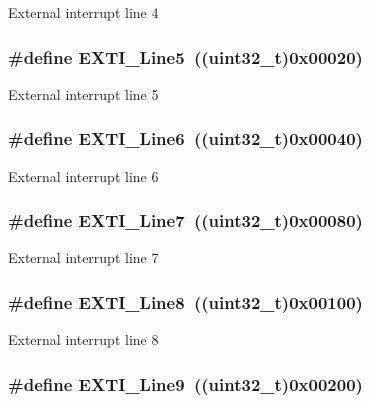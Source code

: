 \label{group__EXTI__Lines_gab33b1fe19306e9e60f8f8d0928b800be}
External interrupt line 4 \hypertarget{group__EXTI__Lines_ga6b4c6292e3abd521cab2bf99d37a15c6}{
\subsubsection[{EXTI\_\-Line5}]{\setlength{\rightskip}{0pt plus 5cm}\#define EXTI\_\-Line5~((uint32\_\-t)0x00020)}}
\label{group__EXTI__Lines_ga6b4c6292e3abd521cab2bf99d37a15c6}
External interrupt line 5 \hypertarget{group__EXTI__Lines_ga97a5145d1d2612dd53bdd9db3d366873}{
\subsubsection[{EXTI\_\-Line6}]{\setlength{\rightskip}{0pt plus 5cm}\#define EXTI\_\-Line6~((uint32\_\-t)0x00040)}}
\label{group__EXTI__Lines_ga97a5145d1d2612dd53bdd9db3d366873}
External interrupt line 6 \hypertarget{group__EXTI__Lines_ga3b7155d54a4a98394b599718901ccbe5}{
\subsubsection[{EXTI\_\-Line7}]{\setlength{\rightskip}{0pt plus 5cm}\#define EXTI\_\-Line7~((uint32\_\-t)0x00080)}}
\label{group__EXTI__Lines_ga3b7155d54a4a98394b599718901ccbe5}
External interrupt line 7 \hypertarget{group__EXTI__Lines_gacd51e087a088c3315049394cddf79e88}{
\subsubsection[{EXTI\_\-Line8}]{\setlength{\rightskip}{0pt plus 5cm}\#define EXTI\_\-Line8~((uint32\_\-t)0x00100)}}
\label{group__EXTI__Lines_gacd51e087a088c3315049394cddf79e88}
External interrupt line 8 \hypertarget{group__EXTI__Lines_ga340ca6bb77b7a2d7747c78e7d3370360}{
\subsubsection[{EXTI\_\-Line9}]{\setlength{\rightskip}{0pt plus 5cm}\#define EXTI\_\-Line9~((uint32\_\-t)0x00200)}}
